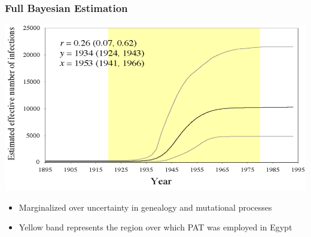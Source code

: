 \begin{frame}
\frametitle{Full Bayesian Estimation}

\includegraphics[width=\textwidth]{../../images/FullBayesianEstimation}

\footnotesize{
\begin{itemize}
	\item  Marginalized over uncertainty in genealogy and mutational processes
	\item  Yellow band represents the region over which PAT was employed in Egypt 
\end{itemize}
}

\end{frame}
